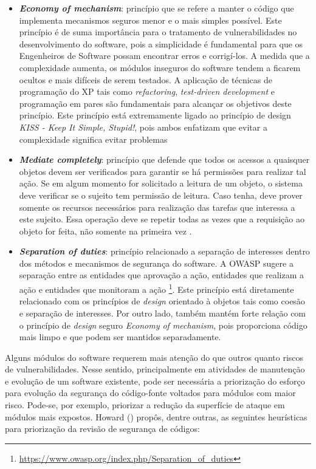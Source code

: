\begin{itemize}
\item \textbf{\emph{Economy of mechanism}}: princípio que se refere a manter o código que implementa mecanismos seguros menor e o mais simples possível. Este princípio é de suma importância para o tratamento de vulnerabilidades no desenvolvimento do software, pois a simplicidade é fundamental para que os Engenheiros de Software possam encontrar erros e corrigí-los. A medida que a complexidade aumenta, os módulos inseguros do software tendem a ficarem ocultos e mais difíceis de serem testados. A aplicação de técnicas de programação do XP tais como \emph{refactoring}, \emph{test-driven development} e programação em pares são fundamentais para alcançar os objetivos deste princípio. Este princípio está extremamente ligado ao princípio de design \emph{KISS - Keep It Simple, Stupid!}, pois ambos enfatizam que evitar a complexidade significa evitar problemas \cite{mcgraw2002}

\item \textbf{\emph{Mediate completely}}: princípio que defende que todos os acessos a quaisquer objetos devem ser verificados para garantir se há permissões para realizar tal ação. Se em algum momento for solicitado a leitura de um objeto, o sistema deve verificar se o sujeito tem permissão de leitura. Caso tenha, deve prover somente os recursos necessários para realização das tarefas que interessa a este sujeito. Essa operação deve se repetir todas as vezes que a requisição ao objeto for feita, não somente na primeira vez \cite{bishop2003}.

\item \textbf{\emph{Separation of duties}}: princípio relacionado a separação de interesses dentro dos métodos e mecanismos de segurança do software. A OWASP sugere a separação entre as entidades que aprovação a ação, entidades que realizam a ação e entidades que monitoram a ação \footnote{\url{https://www.owasp.org/index.php/Separation_of_duties}}. Este princípio está diretamente relacionado com os princípios de \emph{design} orientado à objetos tais como coesão e separação de interesses. Por outro lado, também mantém forte relação com o princípio de \emph{design} seguro \emph{Economy of mechanism}, pois proporciona código mais limpo e que podem ser mantidos separadamente.
\end{itemize}



Alguns módulos do software requerem mais atenção do que outros quanto riscos de vulnerabilidades. Nesse sentido, principalmente em atividades de manutenção e evolução de um software existente, pode ser necessária a priorização do esforço para evolução da segurança do código-fonte voltados para módulos com maior risco. Pode-se, por exemplo, priorizar a redução da superfície de ataque em módulos mais expostos. Howard (\citeyear{howard2006}) propôs, dentre outras, as seguintes heurísticas para priorização da revisão de segurança de códigos:

